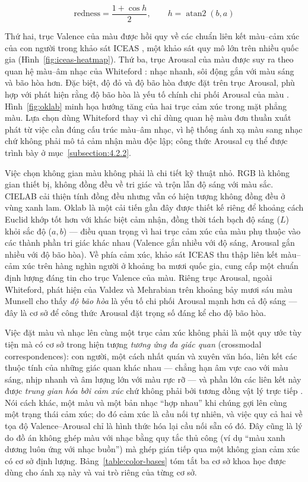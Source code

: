 \documentclass[../DoAn.tex]{subfiles}
\begin{document}
\begin{equation}\label{eq:redness}
  \text{redness} = \frac{1 + \cos h}{2}, \qquad h = \operatorname{atan2}(b, a)
\end{equation}

Thứ hai, trục Valence của màu được hồi quy về các chuẩn liên kết màu--cảm xúc của con người trong khảo sát ICEAS \cite{jonauskaite2020universal}, một khảo sát quy mô lớn trên nhiều quốc gia (Hình~\ref{fig:iceas-heatmap}). Thứ ba, trục Arousal của màu được suy ra theo quan hệ màu--âm nhạc của Whiteford \cite{whiteford2018color}: nhạc nhanh, sôi động gắn với màu sáng và bão hòa hơn. Đặc biệt, độ đỏ và độ bão hòa được đặt trên trục Arousal, phù hợp với phát hiện rằng độ bão hòa là yếu tố chính chi phối Arousal của màu \cite{valdez1994effects}. Hình~\ref{fig:oklab} minh họa hướng tăng của hai trục cảm xúc trong mặt phẳng màu. Lựa chọn dùng Whiteford thay vì chỉ dùng quan hệ màu đơn thuần xuất phát từ việc cần đúng cấu trúc màu--âm nhạc, vì hệ thống ánh xạ màu sang nhạc chứ không phải mô tả cảm nhận màu độc lập; công thức Arousal cụ thể được trình bày ở mục~\ref{subsection:4.2.2}.

Việc chọn không gian màu không phải là chi tiết kỹ thuật nhỏ. RGB là không gian thiết bị, không đồng đều về tri giác và trộn lẫn độ sáng với màu sắc. CIELAB cải thiện tính đồng đều nhưng vẫn có hiện tượng không đồng đều ở vùng xanh lam. Oklab \cite{ottosson2020oklab} là một cải tiến gần đây được thiết kế riêng để khoảng cách Euclid khớp tốt hơn với khác biệt cảm nhận, đồng thời tách bạch độ sáng ($L$) khỏi sắc độ ($a, b$) --- điều quan trọng vì hai trục cảm xúc của màu phụ thuộc vào các thành phần tri giác khác nhau (Valence gắn nhiều với độ sáng, Arousal gắn nhiều với độ bão hòa). Về phía cảm xúc, khảo sát ICEAS \cite{jonauskaite2020universal} thu thập liên kết màu--cảm xúc trên hàng nghìn người ở khoảng ba mươi quốc gia, cung cấp một chuẩn định lượng đáng tin cho trục Valence của màu. Riêng trục Arousal, ngoài Whiteford, phát hiện của Valdez và Mehrabian \cite{valdez1994effects} trên khoảng bảy mươi sáu màu Munsell cho thấy \textit{độ bão hòa} là yếu tố chi phối Arousal mạnh hơn cả độ sáng --- đây là cơ sở để công thức Arousal đặt trọng số đáng kể cho độ bão hòa.

Việc đặt màu và nhạc lên cùng một trục cảm xúc không phải là một quy ước tùy tiện mà có cơ sở trong hiện tượng \textit{tương ứng đa giác quan} (crossmodal correspondences): con người, một cách nhất quán và xuyên văn hóa, liên kết các thuộc tính của những giác quan khác nhau --- chẳng hạn âm vực cao với màu sáng, nhịp nhanh và âm lượng lớn với màu rực rỡ --- và phần lớn các liên kết này được \textit{trung gian hóa bởi cảm xúc} chứ không phải bởi tương đồng vật lý trực tiếp \cite{spence2011crossmodal, palmer2013music}. Nói cách khác, một màu và một bản nhạc ``hợp nhau'' khi chúng gợi lên cùng một trạng thái cảm xúc; do đó cảm xúc là cầu nối tự nhiên, và việc quy cả hai về tọa độ Valence--Arousal chỉ là hình thức hóa lại cầu nối sẵn có đó. Đây cũng là lý do đồ án không ghép màu với nhạc bằng quy tắc thủ công (ví dụ ``màu xanh dương luôn ứng với nhạc buồn'') mà ghép gián tiếp qua một không gian cảm xúc có cơ sở định lượng. Bảng~\ref{table:color-bases} tóm tắt ba cơ sở khoa học được dùng cho ánh xạ này và vai trò riêng của từng cơ sở.
\end{document}
